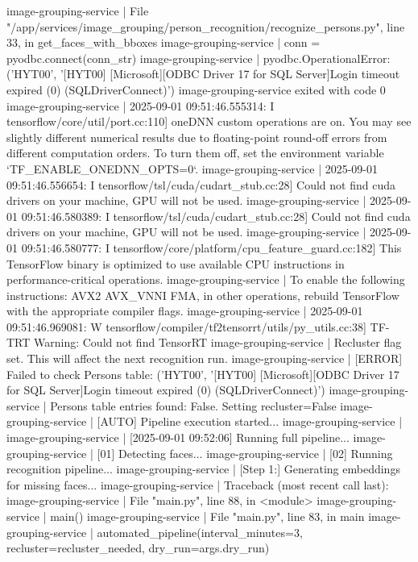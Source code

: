 image-grouping-service  |   File "/app/services/image_grouping/person_recognition/recognize_persons.py", line 33, in get_faces_with_bboxes
image-grouping-service  |     conn = pyodbc.connect(conn_str)
image-grouping-service  | pyodbc.OperationalError: ('HYT00', '[HYT00] [Microsoft][ODBC Driver 17 for SQL Server]Login timeout expired (0) (SQLDriverConnect)')
image-grouping-service exited with code 0
image-grouping-service  | 2025-09-01 09:51:46.555314: I tensorflow/core/util/port.cc:110] oneDNN custom operations are on. You may see slightly different numerical results due to floating-point round-off errors from different computation orders. To turn them off, set the environment variable `TF_ENABLE_ONEDNN_OPTS=0`.
image-grouping-service  | 2025-09-01 09:51:46.556654: I tensorflow/tsl/cuda/cudart_stub.cc:28] Could not find cuda drivers on your machine, GPU will not be used.
image-grouping-service  | 2025-09-01 09:51:46.580389: I tensorflow/tsl/cuda/cudart_stub.cc:28] Could not find cuda drivers on your machine, GPU will not be used.
image-grouping-service  | 2025-09-01 09:51:46.580777: I tensorflow/core/platform/cpu_feature_guard.cc:182] This TensorFlow binary is optimized to use available CPU instructions in performance-critical operations.
image-grouping-service  | To enable the following instructions: AVX2 AVX_VNNI FMA, in other operations, rebuild TensorFlow with the appropriate compiler flags.
image-grouping-service  | 2025-09-01 09:51:46.969081: W tensorflow/compiler/tf2tensorrt/utils/py_utils.cc:38] TF-TRT Warning: Could not find TensorRT
image-grouping-service  | Recluster flag set. This will affect the next recognition run.
image-grouping-service  | [ERROR] Failed to check Persons table: ('HYT00', '[HYT00] [Microsoft][ODBC Driver 17 for SQL Server]Login timeout expired (0) (SQLDriverConnect)')
image-grouping-service  | Persons table entries found: False. Setting recluster=False
image-grouping-service  | [AUTO] Pipeline execution started...
image-grouping-service  |
image-grouping-service  | [2025-09-01 09:52:06] Running full pipeline...
image-grouping-service  | [01] Detecting faces...
image-grouping-service  | [02] Running recognition pipeline...
image-grouping-service  | [Step 1:] Generating embeddings for missing faces...
image-grouping-service  | Traceback (most recent call last):
image-grouping-service  |   File "main.py", line 88, in <module>
image-grouping-service  |     main()
image-grouping-service  |   File "main.py", line 83, in main
image-grouping-service  |     automated_pipeline(interval_minutes=3, recluster=recluster_needed, dry_run=args.dry_run)
